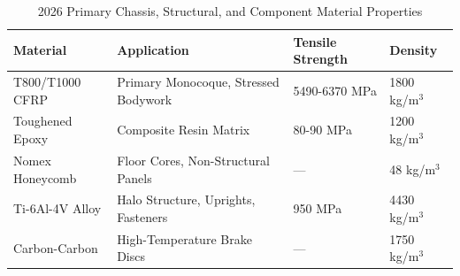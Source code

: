 \begin{table}[H]
\centering
\caption{2026 Primary Chassis, Structural, and Component Material Properties}
\vspace{0.2cm}
\begin{tabularx}{\textwidth}{@{}XXXX@{}}
\toprule
\textbf{Material} & \textbf{Application} & \textbf{Tensile Strength} & \textbf{Density} \\
\midrule
T800/T1000 CFRP & Primary Monocoque, Stressed Bodywork & 5490-6370 MPa & 1800 kg/m$^3$ \\
Toughened Epoxy & Composite Resin Matrix & 80-90 MPa & 1200 kg/m$^3$ \\
Nomex Honeycomb & Floor Cores, Non-Structural Panels & --- & 48 kg/m$^3$ \\
Ti-6Al-4V Alloy & Halo Structure, Uprights, Fasteners & 950 MPa & 4430 kg/m$^3$ \\
Carbon-Carbon   & High-Temperature Brake Discs & --- & 1750 kg/m$^3$ \\
\bottomrule
\end{tabularx}
\label{tab:materials}
\end{table}

